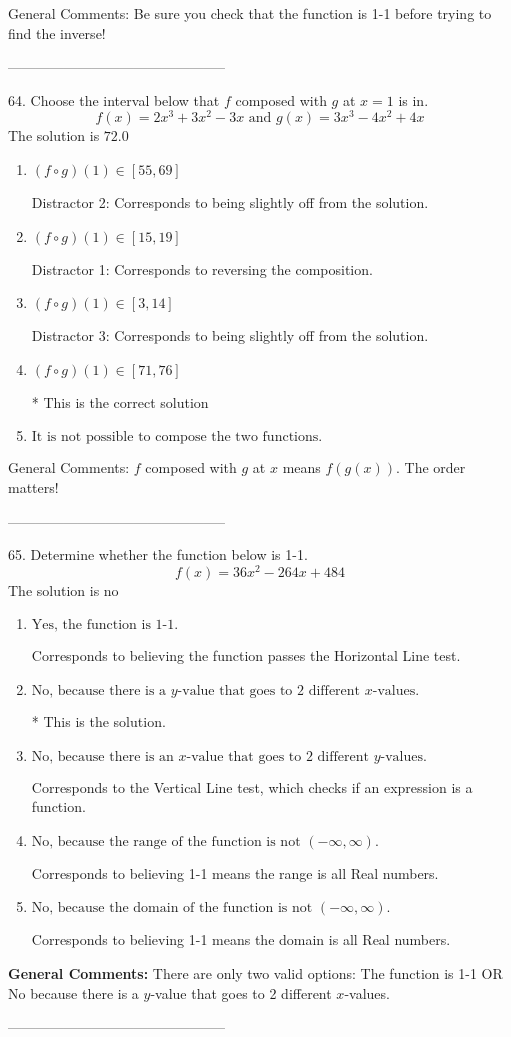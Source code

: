 \documentclass{extbook}[14pt]
\begin{document}
General Comments: Be sure you check that the function is 1-1 before trying to find the inverse!

-----------------------------------------------

64. Choose the interval below that $f$ composed with $g$ at $x=1$ is in.
\[ f(x) = 2x^{3} +3 x^{2} -3 x \text{ and } g(x) = 3x^{3} -4 x^{2} +4 x \] 
The solution is $ 72.0 $ 

\begin{enumerate}[label=\Alph*.] 
\item $ (f \circ g)(1) \in [55, 69] $ 

  Distractor 2: Corresponds to being slightly off from the solution. 
\item $ (f \circ g)(1) \in [15, 19] $ 

  Distractor 1: Corresponds to reversing the composition. 
\item $ (f \circ g)(1) \in [3, 14] $ 

  Distractor 3: Corresponds to being slightly off from the solution. 
\item $ (f \circ g)(1) \in [71, 76] $ 

 * This is the correct solution 
\item $ \text{It is not possible to compose the two functions.} $ 

  
\end{enumerate} 
 
General Comments: $f$ composed with $g$ at $x$ means $f(g(x))$. The order matters!

-----------------------------------------------

65. Determine whether the function below is 1-1.
\[ f(x) = 36 x^2 - 264 x + 484 \] 
The solution is $ \text{no} $ 

\begin{enumerate}[label=\Alph*.] 
\item $ \text{Yes, the function is 1-1.} $ 

 Corresponds to believing the function passes the Horizontal Line test. 
\item $ \text{No, because there is a $y$-value that goes to 2 different $x$-values.} $ 

 * This is the solution. 
\item $ \text{No, because there is an $x$-value that goes to 2 different $y$-values.} $ 

 Corresponds to the Vertical Line test, which checks if an expression is a function. 
\item $ \text{No, because the range of the function is not $(-\infty, \infty)$.} $ 

 Corresponds to believing 1-1 means the range is all Real numbers. 
\item $ \text{No, because the domain of the function is not $(-\infty, \infty)$.} $ 

 Corresponds to believing 1-1 means the domain is all Real numbers. 
\end{enumerate} 
 
\textbf{General Comments:} There are only two valid options: The function is 1-1 OR No because there is a $y$-value that goes to 2 different $x$-values.

-----------------------------------------------
\end{document}
